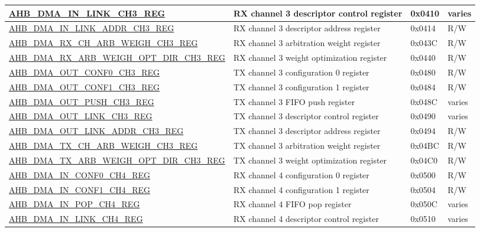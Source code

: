 \begin{longtable}{ | l | p{10cm} | p{1.3cm} | l | }
\hyperref[regdesc:AHBDMAINLINKCHNREG]{AHB\_DMA\_IN\_LINK\_CH3\_REG} & RX channel 3 descriptor control register & 0x0410 & varies \\ \hline
\hyperref[regdesc:AHBDMAINLINKADDRCHNREG]{AHB\_DMA\_IN\_LINK\_ADDR\_CH3\_REG} & RX channel 3 descriptor address register & 0x0414 & R/W \\ \hline
\hyperref[regdesc:AHBDMARXCHARBWEIGHCHNREG]{AHB\_DMA\_RX\_CH\_ARB\_WEIGH\_CH3\_REG} & RX channel 3 arbitration weight register & 0x043C & R/W \\ \hline
\hyperref[regdesc:AHBDMARXARBWEIGHOPTDIRCHNREG]{AHB\_DMA\_RX\_ARB\_WEIGH\_OPT\_DIR\_CH3\_REG} & RX channel 3 weight optimization register & 0x0440 & R/W \\ \hline
\hyperref[regdesc:AHBDMAOUTCONF0CHNREG]{AHB\_DMA\_OUT\_CONF0\_CH3\_REG} & TX channel 3 configuration 0 register & 0x0480 & R/W \\ \hline
\hyperref[regdesc:AHBDMAOUTCONF1CHNREG]{AHB\_DMA\_OUT\_CONF1\_CH3\_REG} & TX channel 3 configuration 1 register & 0x0484 & R/W \\ \hline
\hyperref[regdesc:AHBDMAOUTPUSHCHNREG]{AHB\_DMA\_OUT\_PUSH\_CH3\_REG} & TX channel 3 FIFO push register & 0x048C & varies \\ \hline
\hyperref[regdesc:AHBDMAOUTLINKCHNREG]{AHB\_DMA\_OUT\_LINK\_CH3\_REG} & TX channel 3 descriptor control register & 0x0490 & varies \\ \hline
\hyperref[regdesc:AHBDMAOUTLINKADDRCHNREG]{AHB\_DMA\_OUT\_LINK\_ADDR\_CH3\_REG} & TX channel 3 descriptor address register & 0x0494 & R/W \\ \hline
\hyperref[regdesc:AHBDMATXCHARBWEIGHCHNREG]{AHB\_DMA\_TX\_CH\_ARB\_WEIGH\_CH3\_REG} & TX channel 3 arbitration weight register & 0x04BC & R/W \\ \hline
\hyperref[regdesc:AHBDMATXARBWEIGHOPTDIRCHNREG]{AHB\_DMA\_TX\_ARB\_WEIGH\_OPT\_DIR\_CH3\_REG} & TX channel 3 weight optimization register & 0x04C0 & R/W \\ \hline
\hyperref[regdesc:AHBDMAINCONF0CHNREG]{AHB\_DMA\_IN\_CONF0\_CH4\_REG} & RX channel 4 configuration 0 register & 0x0500 & R/W \\ \hline
\hyperref[regdesc:AHBDMAINCONF1CHNREG]{AHB\_DMA\_IN\_CONF1\_CH4\_REG} & RX channel 4 configuration 1 register & 0x0504 & R/W \\ \hline
\hyperref[regdesc:AHBDMAINPOPCHNREG]{AHB\_DMA\_IN\_POP\_CH4\_REG} & RX channel 4 FIFO pop register & 0x050C & varies \\ \hline
\hyperref[regdesc:AHBDMAINLINKCHNREG]{AHB\_DMA\_IN\_LINK\_CH4\_REG} & RX channel 4 descriptor control register & 0x0510 & varies \\ \hline

\end{longtable}
